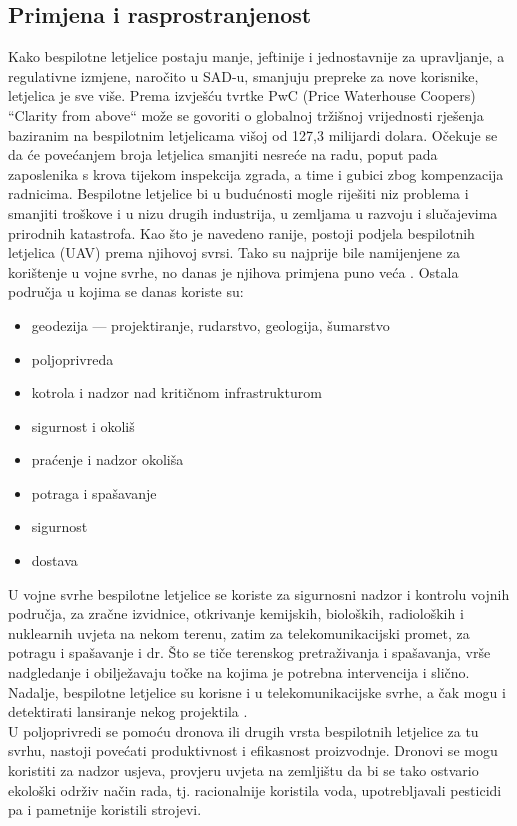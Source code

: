\documentclass[times, utf8, diplomski]{fer}
\begin{document}
\subsection{Primjena i rasprostranjenost}
Kako bespilotne  letjelice  postaju  manje,  jeftinije  i  jednostavnije za  upravljanje,  a regulativne izmjene, naročito u SAD-u, smanjuju prepreke za nove korisnike, letjelica je sve više. 
Prema izvješću tvrtke PwC (Price Waterhouse Coopers) “Clarity from above“ može se govoriti o globalnoj tržišnoj vrijednosti rješenja baziranim na bespilotnim letjelicama višoj od 127,3 milijardi dolara.
Očekuje se da će povećanjem broja letjelica smanjiti nesreće na radu, 
poput pada zaposlenika s krova tijekom inspekcija zgrada, a time i gubici zbog kompenzacija 
radnicima. 
Bespilotne letjelice bi u budućnosti mogle riješiti niz problema i smanjiti troškove i u nizu drugih industrija, u zemljama u razvoju i slučajevima prirodnih katastrofa. \citep{Allianz}
Kao što je navedeno ranije, postoji podjela bespilotnih letjelica (UAV) prema njihovoj svrsi. Tako  su  najprije  bile  namijenjene za korištenje u vojne svrhe, no danas je njihova primjena puno veća \citep{TheUseOfUAS}. Ostala područja u kojima se danas koriste su:\begin{itemize}
\item geodezija --- projektiranje, rudarstvo, geologija, šumarstvo
\item poljoprivreda
\item kotrola i nadzor nad kritičnom infrastrukturom
\item sigurnost i okoliš
\item praćenje i nadzor okoliša
\item potraga i spašavanje
\item sigurnost
\item dostava
\end{itemize}
U  vojne  svrhe bespilotne  letjelice  se  koriste  za  sigurnosni  nadzor  i  kontrolu  vojnih područja, za zračne izvidnice, otkrivanje kemijskih, bioloških, radioloških i nuklearnih uvjeta na nekom terenu, zatim za telekomunikacijski promet, za potragu i spašavanje i dr. Što se tiče terenskog  pretraživanja  i  spašavanja,  vrše  nadgledanje  i  obilježavaju  točke  na  kojima  je potrebna intervencija i slično. Nadalje, bespilotne letjelice  su  korisne  i  u  telekomunikacijske svrhe, a čak mogu i detektirati lansiranje nekog projektila \citep{Military}.\\
U poljoprivredi se pomoću dronova ili drugih vrsta bespilotnih letjelice za tu svrhu, nastoji povećati produktivnost i efikasnost  proizvodnje.  Dronovi  se  mogu  koristiti  za  nadzor usjeva,  provjeru  uvjeta  na  zemljištu  da  bi  se  tako  ostvario  ekološki  održiv  način  rada,  tj. racionalnije koristila voda, upotrebljavali pesticidi pa i pametnije koristili strojevi.
\end{document}
